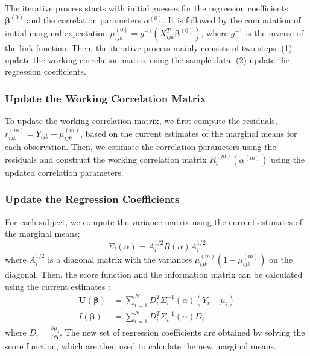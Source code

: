 \documentclass[
]{aft}
\begin{document}
The iterative process starts with initial guesses for the regression
coefficients \(\boldsymbol{\beta}^{(0)}\) and the correlation parameters
\(\alpha^{(0)}\). It is followed by the computation of initial marginal
expectation
\(\mu_{ijk}^{(0)} = g^{-1}(X_{ijk}^T \boldsymbol{\beta}^{(0)})\), where
\(g^{-1}\) is the inverse of the link function. Then, the iterative
process mainly consists of two steps: (1) update the working correlation
matrix using the sample data. (2) update the regression coefficients.

\subsubsection{Update the Working Correlation
Matrix}\label{update-the-working-correlation-matrix}

To update the working correlation matrix, we first compute the
residuals, \(r_{ijk}^{(m)} = Y_{ijk} - \mu_{ijk}^{(m)}\), based on the
current estimates of the marginal means for each observation. Then, we
estimate the correlation parameters using the residuals and construct
the working correlation matrix \(R_i^{(m)}(\alpha^{(m)})\) using the
updated correlation parameters.

\subsubsection{Update the Regression
Coefficients}\label{update-the-regression-coefficients}

For each subject, we compute the variance matrix using the current
estimates of the marginal means: \begin{equation}
\Sigma_i(\alpha) = A_i^{1/2}R(\alpha)A_i^{1/2} \label{eq:geeCovMat}
\end{equation} where \(A_i^{1/2}\) is a diagonal matrix with the
variances \(\mu_{ijk}^{(m)} (1-\mu_{ijk}^{(m)})\) on the diagonal. Then,
the score function and the information matrix can be calculated using
the current estimates \citep{Zeger1988}: \begin{align}
\boldsymbol{U}(\boldsymbol{\beta}) &= \sum_{i=1}^N D_i^T \Sigma_i^{-1}(\alpha) (Y_i - \mu_i) \label{eq:geeScoreEqs}\\
I(\boldsymbol{\beta}) &= \sum_{i=1}^N D_i^T\Sigma_i^{-1}(\alpha)D_i \label{eq:geeInfoMat}
\end{align} where
\(D_i = \frac{\partial\mu_i}{\partial \boldsymbol{\beta}}\). The new set
of regression coefficients are obtained by solving the score function,
which are then used to calculate the new marginal means.
\end{document}

